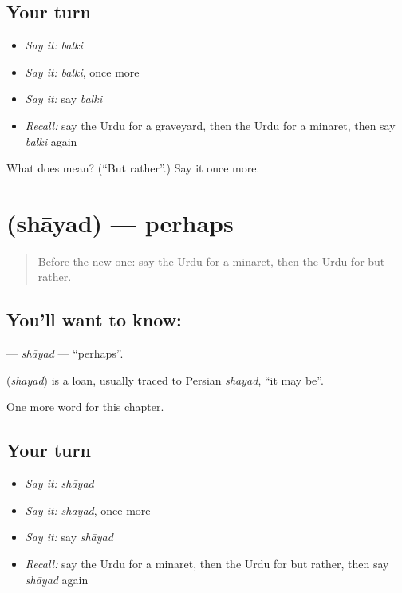 \subsection*{Your turn}
\begin{itemize}
\raggedright
  \item \emph{Say it:} \emph{balki}
  \item \emph{Say it:} \emph{balki}, once more
  \item \emph{Say it:} say \emph{balki}
  \item \emph{Recall:} say the Urdu for a graveyard, then the Urdu for a minaret, then say \emph{balki} again
\end{itemize}

\begin{tcolorbox}[breakable,colback=teal!4,colframe=teal!35!black,title={Before you move on}]
What does  mean? (\textquotedblleft{}But rather\textquotedblright{}.) Say it once more.
\end{tcolorbox}
\section[\texorpdfstring{\ur{شاید} (shāyad)}{شاید (shāyad)}]{ (shāyad) — perhaps}

\label{lesson:UR-C192-shayad}



\begin{quote}
Before the new one: say the Urdu for a minaret, then the Urdu for but rather.
\end{quote}

\subsection*{You'll want to know: }
\textbf{} — \emph{shāyad} — \textquotedblleft{}perhaps\textquotedblright{}.

\begin{cousinweb}
\textbf{} (\emph{shāyad}) is a loan, usually traced to Persian \emph{shāyad}, \textquotedblleft{}it may be\textquotedblright{}.
\end{cousinweb}

\begin{grammarlens}[title={What you've built}]
One more word for this chapter.
\end{grammarlens}

\subsection*{Your turn}
\begin{itemize}
\raggedright
  \item \emph{Say it:} \emph{shāyad}
  \item \emph{Say it:} \emph{shāyad}, once more
  \item \emph{Say it:} say \emph{shāyad}
  \item \emph{Recall:} say the Urdu for a minaret, then the Urdu for but rather, then say \emph{shāyad} again
\end{itemize}

